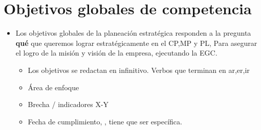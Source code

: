 \section{Objetivos globales de competencia}
\begin{itemize}
    \item Los objetivos globales de la planeación estratégica responden a la pregunta \textbf{qué} que queremos lograr estratégicamente en el CP,MP y PL, Para asegurar el logro de la misión y visión de la empresa, ejecutando la EGC. 
        \begin{itemize}
            \item Los objetivos se redactan en infinitivo. Verbos que terminan en ar,er,ir 
            \item Área de enfoque 
            \item Brecha / indicadores X-Y 
            \item Fecha de cumplimiento, , tiene que ser específica. 
        \end{itemize}    
\end{itemize}



